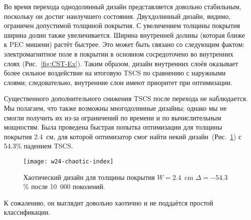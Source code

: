 Во время перехода однодолинный дизайн представляется довольно
стабильным, поскольку он достиг наилучшего состояния. Двухдолинный
дизайн, видимо, ограничен допустимой толщиной покрытия. С увеличением
толщины покрытия ширина долин также увеличивается. Ширина внутренней
долины (которая ближе к PEC мишени) растёт быстрее. Это может быть
связано со следующим фактом: электромагнитное поле в покрытии в
основном сосредоточено во внутренних слоях
(Рис.~\ref{fig:CST-Ex}). Таким образом, дизайн внутренних слоёв
оказывает более сильное воздействие на итоговую TSCS по сравнению с
наружными слоями; следовательно, внутренние слои имеют приоритет при
оптимизации.

Существенного дополнительного снижения TSCS после перехода
не наблюдается. Мы полагаем, что также возможны многодолинные дизайны;
однако мы не смогли получить их из-за ограничений по времени и по
вычислительным мощностям. Была проведена быстрая попытка оптимизации
для толщины покрытия 2.4~см, для которой оптимизатор смог найти некий
дизайн~(Рис.~\ref{fig:thick}) с 54.3\% падением TSCS.
\begin{figure}
  \texttt{[image: w24-chaotic-index]}%
  \caption{Хаотический дизайн для толщины покрытия $W=2.4$~cm
    $\Delta =-54.3$\% после 10~000 поколений.
    \label{fig:thick}}%
\end{figure}
К сожалению, он выглядит довольно хаотично и не поддаётся простой
классификации.


